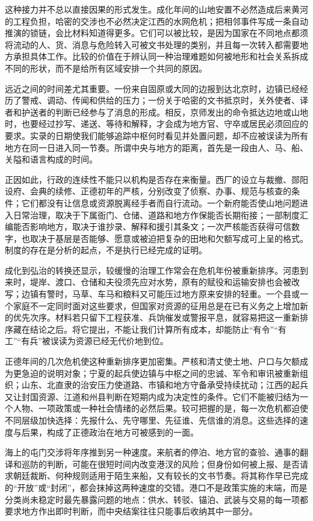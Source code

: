 这种接力并不总以直接因果的形式发生。成化年间的山地安置不必然造成后来黄河的工程负担，哈密的交涉也不必然决定江西的水网危机；把相邻事件写成一条自动推演的锁链，会比材料知道得更多。它们可以被比较，是因为国家在不同地点都须将流动的人、货、消息与危险转入可被文书处理的类别，并且每一次转入都需要地方承担具体工作。比较的价值在于辨认同一种治理难题如何被地形和社会关系拆成不同的形状，而不是给所有区域安排一个共同的原因。

远近之间的时间差尤其重要。一份来自固原或大同的边报到达北京时，边镇已经经历了警戒、调动、传闻和供给的压力；一份关于哈密的文书抵京时，关外使者、译者和护送者的判断已经参与了消息的形成。相反，京师发出的命令抵达边地或山地时，也要经过抄写、递送、等待和解释，才会成为地方官、守卒或居民必须回应的要求。实录的日期使我们能够追踪中枢何时看见并处置问题，却不应被误读为所有地方在同一日进入同一节奏。所谓中央与地方的距离，首先是一段由人、马、船、关隘和语言构成的时间。

正因如此，行政的连续性不能只以机构是否存在来衡量。西厂的设立与裁撤、郧阳设府、会典的续修、正德初年的严核，分别改变了侦察、办事、规范与核查的条件；它们都没有让信息或资源脱离经手者而自行流动。一个新府能否使山地问题进入日常治理，取决于下属衙门、仓储、道路和地方作保能否长期衔接；一部制度汇编能否影响地方，取决于谁抄录、解释和援引其条文；一次严核能否获得可信数字，也取决于基层是否能够、愿意或被迫把复杂的田地和欠额写成可上呈的格式。制度的存在是分析的起点，不是执行已经完成的证明。

成化到弘治的转换还显示，较缓慢的治理工作常会在危机年份被重新排序。河患到来时，堤岸、渡口、仓储和夫役须先应对水势，原有的赋役和运输安排也会被改写；边镇有警时，马草、车马和粮料又可能压过地方原来安排的轻重。一个县或一个家庭不一定同时面对这些要求，但国家对资源的征用总是在已有义务之上增加新的优先次序。材料若只留下工程获准、兵饷催发或警报平息，就容易把这一重新排序藏在结论之后。将它提出，不能让我们计算所有成本，却能防止“有令”“有工”“有兵”被误读为资源已经无代价地到位。

正德年间的几次危机使这种重新排序更加密集。严核和清丈使土地、户口与欠额成为更急迫的说明对象；宁夏的起兵使边镇与中枢之间的忠诚、军令和审讯被重新组织；山东、北直隶的治安压力使道路、市镇和地方守备承受持续扰动；江西的起兵又让封国资源、江道和州县判断在短期内成为决定性的条件。它们不能被归结为一个人物、一项政策或一种社会情绪的必然后果。较可把握的是，每一次危机都迫使不同层级加快选择：先报什么、先守哪里、先征谁、先信谁的消息。这些选择的速度与后果，构成了正德政治在地方可被感到的一面。

海上的屯门交涉将年序推到另一种速度。来航者的停泊、地方官的查验、通事的翻译和巡防的判断，可能在很短时间内改变港汊的风险；但身份如何被上报、是否请求朝廷裁断、何种规则适用于陌生来船，又有较长的文书节奏。将其称作早已完成的“开放”或“封闭”，都会抹掉这两种速度的交错。港口不是政策实施的末端，而是分类尚未稳定时最先暴露问题的地点：供水、转驳、锚泊、武装与交易的每一项都要求地方作出即时判断，而中央结案往往只能事后收纳其中一部分。

